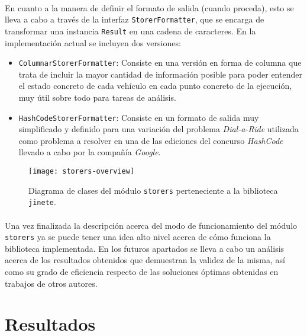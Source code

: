 \documentclass{subfiles}
\begin{document}
          \paragraph{}
          En cuanto a la manera de definir el formato de salida (cuando proceda), esto se lleva a cabo a través de la interfaz \texttt{StorerFormatter}, que se encarga de transformar una instancia \texttt{Result} en una cadena de caracteres. En la implementación actual se incluyen dos versiones:

          \begin{itemize}
            \item \texttt{ColumnarStorerFormatter}: Consiste en una versión en forma de columna que trata de incluir la mayor cantidad de información posible para poder entender el estado concreto de cada vehículo en cada punto concreto de la ejecución, muy útil sobre todo para tareas de análisis.

            \item \texttt{HashCodeStorerFormatter}: Consiste en un formato de salida muy simplificado y definido para una variación del problema \emph{Dial-a-Ride} utilizada como problema a resolver en una de las ediciones del concurso \emph{HashCode} llevado a cabo por la compañía \emph{Google}.

          \end{itemize}
          
          \begin{figure}[ht]
            \centering
            \texttt{[image: storers-overview]}
            \caption{Diagrama de clases del módulo \texttt{storers} perteneciente a la biblioteca \texttt{jinete}.}
            \label{img:storers_overview}
          \end{figure}

          \paragraph{}
          Una vez finalizada la descripción acerca del modo de funcionamiento del módulo \texttt{storers} ya se puede tener una idea alto nivel acerca de cómo funciona la biblioteca implementada. En los futuros apartados se lleva a cabo un análisis acerca de los resultados obtenidos que demuestran la validez de la misma, así como su grado de eficiencia respecto de las soluciones óptimas obtenidas en trabajos de otros autores.

    \section{Resultados}
    \label{sec:results}
\end{document}
